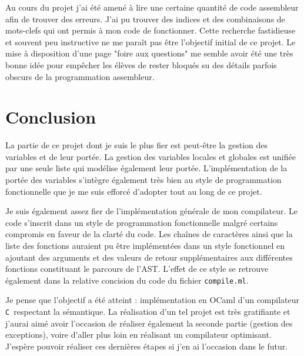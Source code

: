 \documentclass[11pt]{article}
\newcommand{\Cmm}{\texttt{C\textminus\textminus\ }}
\newcommand{\ttt}[1]{\texttt{#1}}
\begin{document}
Au cours du projet j'ai été amené à lire une certaine quantité de code assembleur afin de trouver des erreurs.
J'ai pu trouver des indices et des combinaisons de mots-clefs qui ont permis à mon code de fonctionner.
Cette recherche fastidieuse et souvent peu instructive ne me paraît pas être l'objectif initial de ce projet.
Le mise à disposition d'une page "foire aux questions" me semble avoir été une très bonne idée pour empêcher les élèves de rester bloqués su des détails parfois obscurs de la programmation assembleur.

\section{Conclusion}
La partie de ce projet dont je suis le plus fier est peut-être la gestion des variables et de leur portée.
La gestion des variables locales et globales est unifiée par une seule liste qui modélise également leur portée.
L'implémentation de la portée des variables s'intègre également très bien au style de programmation fonctionnelle que je me suis efforcé d'adopter tout au long de ce projet.

Je suis également assez fier de l'implémentation générale de mon compilateur.
Le code s'inscrit dans un style de programmation fonctionnelle malgré certains compromis en faveur de la clarté du code.
Les chaînes de caractères ainsi que la liste des fonctions auraient pu être implémentées dans un style fonctionnel en ajoutant des arguments et des valeurs de retour supplémentaires aux différentes fonctions constituant le parcours de l'AST.
L'effet de ce style se retrouve également dans la relative concision du code du fichier \ttt{compile.ml}.

Je pense que l'objectif a été atteint : implémentation en OCaml d'un compilateur \Cmm respectant la sémantique.
La réalisation d'un tel projet est très gratifiante et j'aurai aimé avoir l'occasion de réaliser également la seconde partie (gestion des exceptions), voire d'aller plus loin en réalisant un compilateur optimisant.
J'espère pouvoir réaliser ces dernières étapes si j'en ai l'occasion dans le futur.
\end{document}
